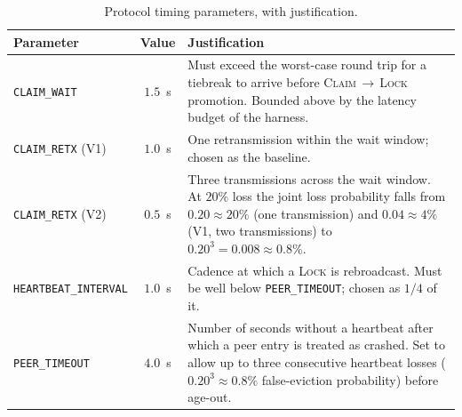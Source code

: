 \documentclass[11pt,letterpaper]{article}
\begin{document}
\begin{table}[h]
\centering
\caption{Protocol timing parameters, with justification.}
\label{tab:timing}
\renewcommand{\arraystretch}{1.25}
\begin{tabular}{@{}l c p{8.5cm}@{}}
\toprule
\textbf{Parameter} & \textbf{Value} & \textbf{Justification} \\
\midrule
\texttt{CLAIM\_WAIT}        & $1.5$~s             & Must exceed the worst-case round trip
                                                     for a tiebreak to arrive before
                                                     \textsc{Claim}$\,\to\,$\textsc{Lock}
                                                     promotion. Bounded above by the
                                                     latency budget of the harness. \\
\texttt{CLAIM\_RETX} (V1)   & $1.0$~s             & One retransmission within the wait
                                                     window; chosen as the baseline. \\
\texttt{CLAIM\_RETX} (V2)   & $0.5$~s             & Three transmissions across the wait
                                                     window. At $20\%$ loss the joint
                                                     loss probability falls from
                                                     $0.20\!\approx\!20\%$ (one transmission)
                                                     and $0.04\!\approx\!4\%$ (V1, two
                                                     transmissions) to
                                                     $0.20^3\!=\!0.008\!\approx\!0.8\%$. \\
\texttt{HEARTBEAT\_INTERVAL}& $1.0$~s             & Cadence at which a \textsc{Lock} is
                                                     rebroadcast. Must be well below
                                                     \texttt{PEER\_TIMEOUT}; chosen as
                                                     $1/4$ of it. \\
\texttt{PEER\_TIMEOUT}      & $4.0$~s             & Number of seconds without a heartbeat
                                                     after which a peer entry is treated
                                                     as crashed. Set to allow up to three
                                                     consecutive heartbeat losses
                                                     ($0.20^3\!\approx\!0.8\%$ false-eviction
                                                     probability) before age-out. \\
\bottomrule
\end{tabular}
\end{table}
\end{document}
